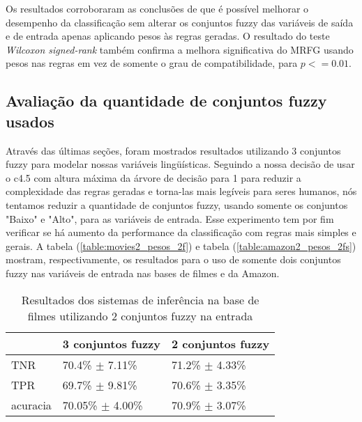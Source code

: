 \documentclass[template.tex]{subfiles}
\begin{document}
%
%
%

Os resultados corroboraram as conclusões de \cite{ishibuchi2001effect} que é possível melhorar o desempenho da classificação sem alterar os conjuntos fuzzy das variáveis de saída e de entrada apenas aplicando pesos às regras geradas. O resultado do teste \textit{Wilcoxon signed-rank} também confirma a melhora significativa do MRFG usando pesos nas regras em vez de somente o grau de compatibilidade, para $p <= 0.01$.

\subsection{Avaliação da quantidade de conjuntos fuzzy usados}

Através das últimas seções, foram mostrados resultados utilizando 3 conjuntos fuzzy para modelar nossas variáveis lingüísticas. Seguindo a nossa decisão de usar o c4.5 com altura máxima da árvore de decisão para 1 para reduzir a complexidade das regras geradas e torna-las mais legíveis para seres humanos, nós tentamos reduzir a quantidade de conjuntos fuzzy, usando somente os conjuntos "Baixo" e "Alto", para as variáveis de entrada. Esse experimento tem por fim verificar se há aumento da performance da classificação com regras mais simples e gerais. A tabela (\ref{table:movies2_pesos_2f}) e tabela (\ref{table:amazon2_pesos_2fs}) mostram, respectivamente, os resultados para o uso de somente dois conjuntos fuzzy nas variáveis de entrada nas bases de filmes e da Amazon.

\begin{table}[!h]
    \begin{tabular}{lll}
    ~         			& 3 conjuntos fuzzy 							& 2 conjuntos fuzzy \\ \hline
    TNR 		  		& 70.4\% $\pm$ 7.11\%         			& 71.2\% $\pm$ 4.33\%    \\
    TPR    		 	& 69.7\% $\pm$ 9.81\%        			& 70.6\% $\pm$ 3.35\%   \\
    acuracia  	 	& 70.05\% $\pm$ 4.00\%    			& 70.9\% $\pm$ 3.07\%    \\
    \end{tabular}
    \caption{Resultados dos sistemas de inferência na base de filmes utilizando 2 conjuntos fuzzy na entrada}
	\label{table:movies2_pesos_2fs}
\end{table}
\end{document}

